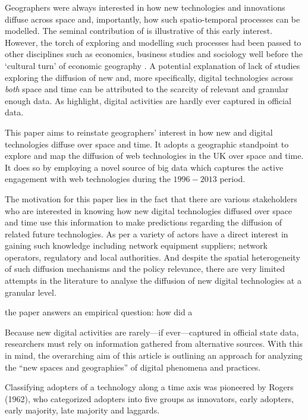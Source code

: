 \documentclass[
  authoryear,
  preprint,
  3p]{elsarticle}
\begin{document}
Geographers were always interested in how new technologies and
innovations diffuse across space and, importantly, how such
spatio-temporal processes can be modelled. The seminal contribution of
\citet{hagerstrand1968innovation} is illustrative of this early
interest. However, the torch of exploring and modelling such processes
had been passed to other disciplines such as economics, business studies
and sociology well before the `cultural turn' of economic geography
\citep{perkins2005international}. A potential explanation of lack of
studies exploring the diffusion of new and, more specifically, digital
technologies across \emph{both} space and time can be attributed to the
scarcity of relevant and granular enough data. As
\citet{zook2022mapping} highlight, digital activities are hardly ever
captured in official data.

This paper aims to reinstate geographers' interest in how new and
digital technologies diffuse over space and time. It adopts a geographic
standpoint to explore and map the diffusion of web technologies in the
UK over space and time. It does so by employing a novel source of big
data which captures the active engagement with web technologies during
the \(1996-2013\) period.

The motivation for this paper lies in the fact that there are various
stakeholders who are interested in knowing how new digital technologies
diffused over space and time use this information to make predictions
regarding the diffusion of related future technologies. As per
\citet{meade2021modelling} a variety of actors have a direct interest in
gaining such knowledge including network equipment suppliers; network
operators, regulatory and local authorities. And despite the spatial
heterogeneity of such diffusion mechanisms and the policy relevance,
there are very limited attempts in the literature to analyse the
diffusion of new digital technologies at a granular level.

the paper answers an empirical question: how did a

\citet{zook2022mapping} Because new digital activities are rarely---if
ever---captured in official state data, researchers must rely on
information gathered from alternative sources. With this in mind, the
overarching aim of this article is outlining an approach for analyzing
the ``new spaces and geographies'' of digital phenomena and practices.

Classifying adopters of a technology along a time axis was pioneered by
Rogers (1962), who categorized adopters into five groups as innovators,
early adopters, early majority, late majority and laggards.
\end{document}
